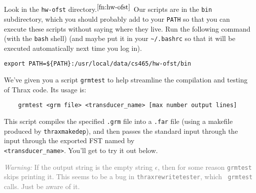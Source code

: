 \documentclass[11pt]{article}
\begin{document}
  \item Look in the \texttt{hw-ofst} directory.$^{\ref{fn:hw-ofst}}$
    Our scripts are in the {\tt bin} subdirectory, which you should
    probably add to your {\tt PATH} so that you can execute these
    scripts without saying where they live.  Run the following
    command (with the \texttt{bash} shell) 
    (and maybe put it in your {\tt \textasciitilde{}/.bashrc} so that it will be
    executed automatically next time you log in).
\begin{verbatim}
export PATH=${PATH}:/usr/local/data/cs465/hw-ofst/bin
\end{verbatim}

  \item We've given you a script \texttt{grmtest} to help streamline
    the compilation and testing of Thrax code. Its usage is:

    \begin{center}
	\begin{verbatim}
	grmtest <grm file> <transducer_name> [max number output lines]
	\end{verbatim}
	\end{center}

    This script compiles the specified \texttt{.grm} file into a
    \texttt{.far} file (using a makefile produced by {\tt thraxmakedep}),
    and then passes the standard input through the
    input through the exported FST named by\\ \verb/<transducer_name>/.  You'll get to try it out below.

    \textcolor{gray}{{\em Warning:} If the output string is the empty string
    $\epsilon$, then for some reason {\tt grmtest} skips printing it.
    This seems to be a bug in {\tt thraxrewritetester}, which {\tt
      grmtest} calls.  Just be aware of it.}
\end{document}
